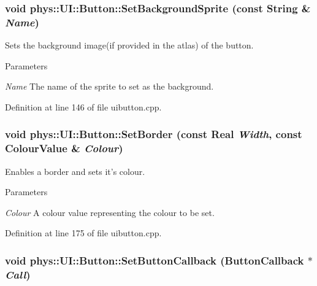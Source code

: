 \hypertarget{classphys_1_1UI_1_1Button_a7cecb219a59fb55db6ac0070359bb23f}{
\subsubsection[{SetBackgroundSprite}]{\setlength{\rightskip}{0pt plus 5cm}void phys::UI::Button::SetBackgroundSprite (const {\bf String} \& {\em Name})}}
\label{d8/d88/classphys_1_1UI_1_1Button_a7cecb219a59fb55db6ac0070359bb23f}


Sets the background image(if provided in the atlas) of the button. 


\begin{DoxyParams}{Parameters}
\item[{\em Name}]The name of the sprite to set as the background. \end{DoxyParams}


Definition at line 146 of file uibutton.cpp.

\hypertarget{classphys_1_1UI_1_1Button_ac29d118258d105217f3d1f72c634072c}{
\subsubsection[{SetBorder}]{\setlength{\rightskip}{0pt plus 5cm}void phys::UI::Button::SetBorder (const {\bf Real} {\em Width}, \/  const {\bf ColourValue} \& {\em Colour})}}
\label{d8/d88/classphys_1_1UI_1_1Button_ac29d118258d105217f3d1f72c634072c}


Enables a border and sets it's colour. 


\begin{DoxyParams}{Parameters}
\item[{\em Colour}]A colour value representing the colour to be set. \end{DoxyParams}


Definition at line 175 of file uibutton.cpp.

\hypertarget{classphys_1_1UI_1_1Button_aa9f8c1e2e91e22405bacd298c88eb845}{
\subsubsection[{SetButtonCallback}]{\setlength{\rightskip}{0pt plus 5cm}void phys::UI::Button::SetButtonCallback ({\bf ButtonCallback} $\ast$ {\em Call})}}
\label{d8/d88/classphys_1_1UI_1_1Button_aa9f8c1e2e91e22405bacd298c88eb845}



